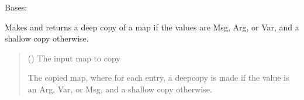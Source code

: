 \documentclass[letterpaper,10pt,english]{sphinxmanual}
\begin{document}
\begin{fulllineitems}
\label{\detokenize{apache_commons_validator_python.util:apache_commons_validator_python.util.validator_utils.ValidatorUtils}}
\pysigstartsignatures
{}
\pysigstopsignatures
\sphinxAtStartPar
Bases: 

\begin{fulllineitems}
\label{\detokenize{apache_commons_validator_python.util:apache_commons_validator_python.util.validator_utils.ValidatorUtils.copy_map}}
\pysigstartsignatures
{}
\pysigstopsignatures
\sphinxAtStartPar
Makes and returns a deep copy of a map if the values are Msg, Arg, or Var,
and a shallow copy otherwise.
\begin{quote}\begin{description}
\sphinxAtStartPar
{} (\sphinxstyleliteralemphasis{\sphinxupquote{{[}}}\sphinxstyleliteralemphasis{\sphinxupquote{, }}\sphinxstyleliteralemphasis{\sphinxupquote{{]}}}) \textendash{} The input map to copy

\sphinxAtStartPar
The copied map, where for each entry, a deepcopy is made if the value
is an Arg, Var, or Msg, and a shallow copy otherwise.

\end{description}\end{quote}

\end{fulllineitems}



\end{fulllineitems}
\end{document}
